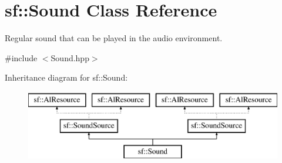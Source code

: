 \hypertarget{classsf_1_1_sound}{\section{sf\-:\-:Sound Class Reference}
\label{classsf_1_1_sound}
}


Regular sound that can be played in the audio environment.  




{\ttfamily \#include $<$Sound.\-hpp$>$}

Inheritance diagram for sf\-:\-:Sound\-:\begin{figure}[H]
\begin{center}
\leavevmode
\includegraphics[height=3.000000cm]{classsf_1_1_sound}
\end{center}
\end{figure}
